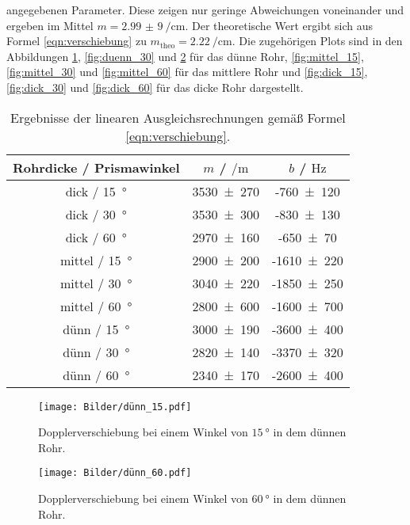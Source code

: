 angegebenen Parameter. 
Diese zeigen nur geringe Abweichungen voneinander und ergeben im 
Mittel $m = \SI{2,99(9)}{\per\centi\meter}$. Der theoretische Wert ergibt sich aus Formel 
\eqref{eqn:verschiebung} zu $m_{\mathrm{theo}} = \SI{2,22}{\per\centi\meter}$.
Die zugehörigen Plots sind in den Abbildungen \ref{fig:duenn_15}, \ref{fig:duenn_30} und
\ref{fig:duenn_60} für das dünne Rohr, \ref{fig:mittel_15}, \ref{fig:mittel_30} und 
\ref{fig:mittel_60} für das mittlere Rohr und \ref{fig:dick_15}, \ref{fig:dick_30} und
\ref{fig:dick_60} für das dicke Rohr dargestellt.
\begin{table}
	\centering
	\caption{Ergebnisse der linearen Ausgleichsrechnungen gemäß Formel \eqref{eqn:verschiebung}.}
	\label{tab:fitcoeff}
	\begin{tabular}{ccc}
		\toprule
		Rohrdicke / Prismawinkel & $m$ / $\si{\per\meter}$ & $b$ / $\si{\hertz}$ \\
		\midrule
		dick / \SI{15}{\degree} & \num{3530(270)} & -\num{760(120)} \\
		dick / \SI{30}{\degree} & \num{3530(300)} & -\num{830(130)} \\
		dick / \SI{60}{\degree} & \num{2970(160)} & -\num{650(70)} \\
		mittel / \SI{15}{\degree} & \num{2900(200)} & -\num{1610(220)} \\
		mittel / \SI{30}{\degree} & \num{3040(220)} & -\num{1850(250)} \\
		mittel / \SI{60}{\degree} & \num{2800(600)} & -\num{1600(700)} \\
		dünn / \SI{15}{\degree} & \num{3000(190)} & -\num{3600(400)} \\
		dünn / \SI{30}{\degree} & \num{2820(140)} & -\num{3370(320)} \\
		dünn / \SI{60}{\degree} & \num{2340(170)} & -\num{2600(400)} \\
		\bottomrule
	\end{tabular}
\end{table}
\begin{figure}
	 \centering
	  \caption{Dopplerverschiebung bei einem Winkel von $\SI{15}{\degree}$ in dem dünnen Rohr.}
	   \texttt{[image: Bilder/dünn\_15.pdf]}
	    \label{fig:duenn_15}
\end{figure}

\begin{figure}
	 \centering
	  \caption{Dopplerverschiebung bei einem Winkel von $\SI{60}{\degree}$ in dem dünnen Rohr.}
	   \texttt{[image: Bilder/dünn\_60.pdf]}
	    \label{fig:duenn_60}
\end{figure}


